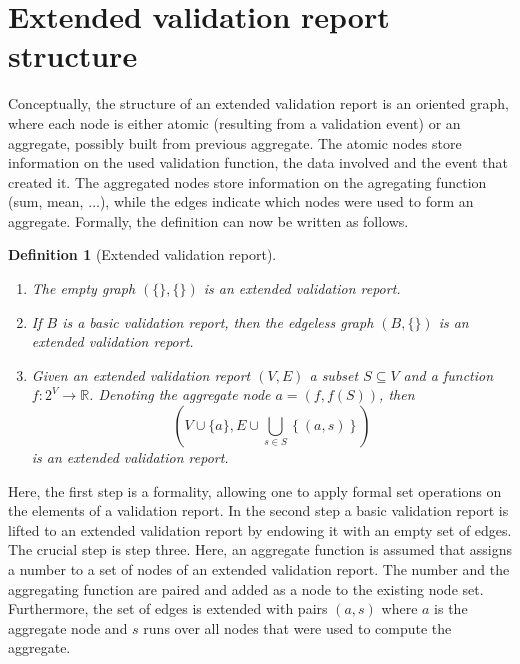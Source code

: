 \documentclass[a4paper, 11pt]{article}
\newtheorem{definition}{Definition}
\begin{document}
\section{Extended validation report structure}
Conceptually, the structure of an extended validation report is an oriented
graph, where each node is either atomic (resulting from a validation event) or
an aggregate, possibly built from previous aggregate. The atomic nodes store
information on the used validation function, the data involved and the event
that created it. The aggregated nodes store information on the agregating
function (sum, mean, $\ldots$), while the edges indicate which nodes were used
to form an aggregate. Formally, the definition can  now be written as follows.
%
\begin{definition}[Extended validation report]\leavevmode
\begin{enumerate}
\item The empty graph $(\{\},\{\})$ is an extended validation report.
\item If $B$ is a basic validation report, then the edgeless graph $(B, \{\})$
is an extended validation report.
\item Given an extended validation report $(V,E)$  a subset $S\subseteq V$ and
a function $f:2^V\to\mathbb{R}$.  Denoting the aggregate node $a=(f,f(S))$, then 
\begin{displaymath}
\left(
V\cup \{a\}, E\cup \bigcup_{s\in S}\left\{( a, s )\right\}
\right)
\end{displaymath}
is an extended validation report.
\end{enumerate}
\end{definition}
Here, the first step is a formality, allowing one to apply formal set
operations on the elements of a validation report. In the second step a basic
validation report is lifted to an extended validation report by endowing it
with an empty set of edges. The crucial step is step three. Here, an aggregate
function is assumed that assigns a number to a set of nodes of an extended
validation report. The number and the aggregating function are paired and added
as a node to the existing node set. Furthermore, the set of edges is extended
with pairs $(a,s)$ where $a$ is the aggregate node and $s$ runs over all nodes
that were used to compute the aggregate.




\end{document}
